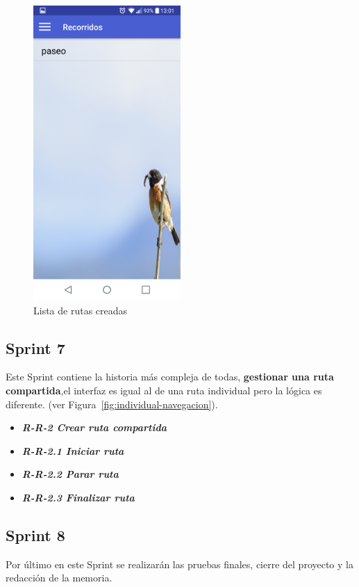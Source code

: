 \begin{figure}[htbp]
		\centering
		\includegraphics[width=0.5\textwidth] {capturamovil/listarutas}
		\caption{Lista de rutas creadas}
		 \label{fig:listarutas}
	\end{figure}
\newpage
\subsection{Sprint 7}
Este Sprint contiene la historia más compleja de todas,\textbf{ gestionar una ruta compartida},el interfaz es igual al de una ruta individual pero la lógica es diferente. (ver Figura~\ref{fig:individual-navegacion}).

\begin{itemize}
\item \textbf{\textit{R-R-2 Crear ruta compartida}}
\item \textbf{\textit{R-R-2.1 Iniciar ruta}}
\item \textbf{\textit{R-R-2.2 Parar ruta}}
\item \textbf{\textit{R-R-2.3 Finalizar ruta}}
\end{itemize}










\subsection{Sprint 8}

Por último en este Sprint se realizarán las pruebas finales, cierre del proyecto y la redacción de la memoria.

